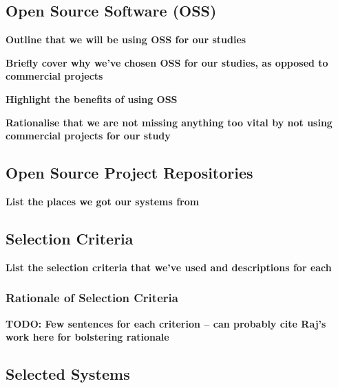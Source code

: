 
\subsection{Open Source Software (OSS)} %
\label{sub:open_source_software_oss_}

\textbf{Outline that we will be using OSS for our studies}

\textbf{Briefly cover why we've chosen OSS for our studies, as opposed to commercial projects}

\textbf{Highlight the benefits of using OSS}

\textbf{Rationalise that we are not missing anything too vital by not using commercial projects for our study}


\subsection{Open Source Project Repositories} %
\label{sub:open_source_project_repositories}

\textbf{List the places we got our systems from}


\subsection{Selection Criteria} %
\label{sub:selection_criteria}

\textbf{List the selection criteria that we've used and descriptions for each}

\subsubsection{Rationale of Selection Criteria} %
\label{ssub:rationale_of_selection_criteria}

\textbf{TODO: Few sentences for each criterion -- can probably cite Raj's work here for bolstering rationale}



\subsection{Selected Systems} %
\label{sub:selected_systems}

